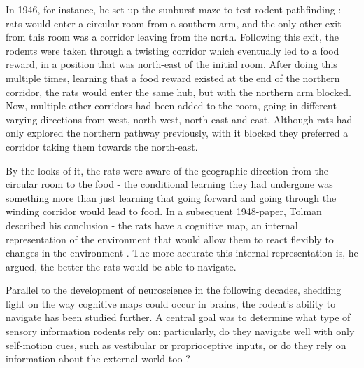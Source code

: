 \documentclass{article}
\begin{document}
    In 1946, for instance, he set up the sunburst maze to test rodent pathfinding \parencite{Tolman1946}: rats would enter a circular room from a southern arm, and the only other exit from this room was a corridor leaving from the north. Following this exit, the rodents were taken through a twisting corridor which eventually led to a food reward, in a position that was north-east of the initial room. After doing this multiple times, learning that a food reward existed at the end of the northern corridor, the rats would enter the same hub, but with the northern arm blocked. Now, multiple other corridors had been added to the room, going in different varying directions from west, north west, north east and east. Although rats had only explored the northern pathway previously, with it blocked they preferred a corridor taking them towards the north-east. 
    
    By the looks of it, the rats were aware of the geographic direction from the circular room to the food - the conditional learning they had undergone was something more than just learning that going forward and going through the winding corridor would lead to food. In a subsequent 1948-paper, Tolman described his conclusion - the rats have a cognitive map, an internal representation of the environment that would allow them to react flexibly to changes in the environment \parencite{Tolman1948}. The more accurate this internal representation is, he argued, the better the rats would be able to navigate.

    Parallel to the development of neuroscience in the following decades, shedding light on the way cognitive maps could occur in brains, the rodent's ability to navigate has been studied further. A central goal was to determine what type of sensory information rodents rely on: particularly, do they navigate well with only self-motion cues, such as vestibular or proprioceptive inputs, or do they rely on information about the external world too \parencite{Dudchenko2010}?
\end{document}
